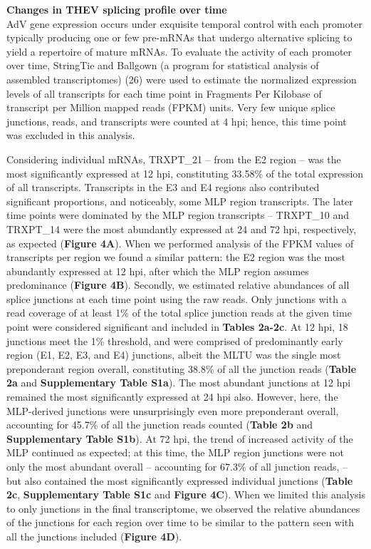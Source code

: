 \documentclass[
]{article}
\begin{document}
\textbf{Changes in THEV splicing profile over time}\\
AdV gene expression occurs under exquisite temporal control with each
promoter typically producing one or few pre-mRNAs that undergo
alternative splicing to yield a repertoire of mature mRNAs. To evaluate
the activity of each promoter over time, StringTie and Ballgown (a
program for statistical analysis of assembled transcriptomes) (26) were
used to estimate the normalized expression levels of all transcripts for
each time point in Fragments Per Kilobase of transcript per Million
mapped reads (FPKM) units. Very few unique splice junctions, reads, and
transcripts were counted at 4 hpi; hence, this time point was excluded
in this analysis.

Considering individual mRNAs, TRXPT\_21 -- from the E2 region -- was the
most significantly expressed at 12 hpi, constituting 33.58\% of the
total expression of all transcripts. Transcripts in the E3 and E4
regions also contributed significant proportions, and noticeably, some
MLP region transcripts. The later time points were dominated by the MLP
region transcripts -- TRXPT\_10 and TRXPT\_14 were the most abundantly
expressed at 24 and 72 hpi, respectively, as expected (\textbf{Figure
4A}). When we performed analysis of the FPKM values of transcripts per
region we found a similar pattern: the E2 region was the most abundantly
expressed at 12 hpi, after which the MLP region assumes predominance
(\textbf{Figure 4B}). Secondly, we estimated relative abundances of all
splice junctions at each time point using the raw reads. Only junctions
with a read coverage of at least 1\% of the total splice junction reads
at the given time point were considered significant and included in
\textbf{Tables 2a-2c}. At 12 hpi, 18 junctions meet the 1\% threshold,
and were comprised of predominantly early region (E1, E2, E3, and E4)
junctions, albeit the MLTU was the single most preponderant region
overall, constituting 38.8\% of all the junction reads (\textbf{Table
2a} and \textbf{Supplementary Table S1a}). The most abundant junctions
at 12 hpi remained the most significantly expressed at 24 hpi also.
However, here, the MLP-derived junctions were unsurprisingly even more
preponderant overall, accounting for 45.7\% of all the junction reads
counted (\textbf{Table 2b} and \textbf{Supplementary Table S1b}). At 72
hpi, the trend of increased activity of the MLP continued as expected;
at this time, the MLP region junctions were not only the most abundant
overall -- accounting for 67.3\% of all junction reads, -- but also
contained the most significantly expressed individual junctions
(\textbf{Table 2c}, \textbf{Supplementary Table S1c} and \textbf{Figure
4C}). When we limited this analysis to only junctions in the final
transcriptome, we observed the relative abundances of the junctions for
each region over time to be similar to the pattern seen with all the
junctions included (\textbf{Figure 4D}).
\end{document}
